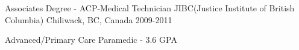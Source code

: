 

\begin{cventries}

  \cventry
    {Associates Degree - ACP-Medical Technician} %
    {JIBC(Justice Institute of British Columbia)} %
    {Chiliwack, BC, Canada} %
    {2009-2011} %
    {
      \begin{cvitems} %
        \item {Advanced/Primary Care Paramedic - 3.6 GPA}
      \end{cvitems}
    }

\end{cventries}
